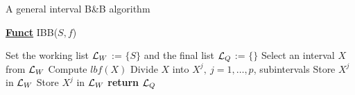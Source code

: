 \begin{algorithm}[H]
\caption{A general interval B\&B algorithm} 
\label{alg:ibb} 
\textbf{\underline{Funct}} IBB($S,f$)
\begin{algorithmic}[1] %
\State Set the working list ${\cal L}_W$ := $\{S\}$ and the final list ${\cal L}_Q$ := $\{\}$     
 \label{alg:igoend}
	\State  Select an interval $X$ from ${\cal L}_W$ \label{step:selrule}  
	\State Compute $lbf(X)$ 		  
	 
		\State Divide $X$ into $X^j,\ j=1,\dots, p$, subintervals   
			 
				\State Store $X^j$ in ${\cal L}_W$ 
			\Else
				\State Store $X^j$ in ${\cal L}_W$ 
			\EndIf
		\EndFor  
	\EndIf
\EndWhile
\State \textbf{return} ${\cal L}_Q$
\end{algorithmic}
\end{algorithm}
